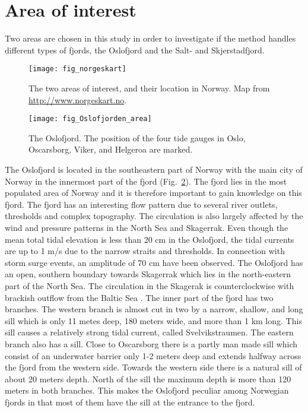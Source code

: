 \section{Area of interest}
Two areas are chosen in this study in order to investigate if the method handles different types of fjords, the Oslofjord and the Salt- and Skjerstadfjord.

\begin{figure}[!t]
\centering
\texttt{[image: fig\_norgeskart]}
\caption{The two areas of interest, and their location in Norway. Map from \url{http://www.norgeskart.no}.}
\label{fig:area0}
\end{figure}

\begin{figure}[!t]
\centering
\texttt{[image: fig\_Oslofjorden\_area]}
\caption{The Oslofjord. The position of the four tide gauges in Oslo, Oscarsborg, Viker, and Helgeroa are marked.}
\label{fig:area1}
\end{figure}

The Oslofjord is located in the southeastern part of Norway with the main city of Norway in the innermost part of the fjord (Fig.~\ref{fig:area1}). The fjord lies in the most populated area of Norway and it is therefore important to gain knowledge on this fjord. The fjord has an interesting flow pattern due to several river outlets, thresholds and complex topography. The circulation is also largely affected by the wind and pressure patterns in the North Sea and Skagerrak. 
Even though the mean total tidal elevation is less than 20 cm in the Oslofjord, the tidal currents are up to 1 m/s due to the narrow straits and thresholds. In connection with storm surge events, an amplitude of 70 cm have been observed. The Oslofjord has an open, southern boundary towards Skagerrak which lies in the north-eastern part of the North Sea. The circulation in the Skagerak is counterclockwise with brackish outflow from the Baltic Sea \cite[]{rodhe96,svendsen96}. 
The inner part of the fjord has two branches. The western branch is almost cut in two by a narrow, shallow, and long sill which is only 11 metes deep, 180 meters wide, and more than 1 km long. This sill causes a relatively strong tidal current, called Svelvikstraumen. The eastern branch also has a sill. Close to Oscarsborg there is a partly man made sill which consist of an underwater barrier only 1-2 meters deep and extends halfway across the fjord from the western side. Towards the western side there is a natural sill of about 20 meters depth. North of the sill the maximum depth is more than 120 meters in both branches.  This makes the Oslofjord peculiar among Norwegian fjords in that most of them have the sill at the entrance to the fjord.

